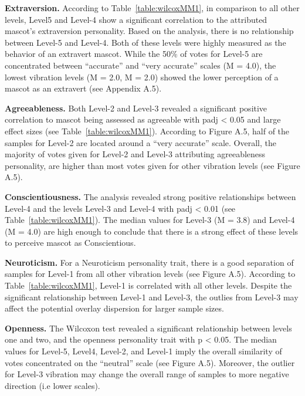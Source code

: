 \par \textbf{Extraversion.} According to Table~\ref{table:wilcoxMM1}, in comparison to all other levels, Level5 and
Level-4 show a significant correlation to the attributed mascot’s extraversion personality. Based on the analysis,
there is no relationship between Level-5 and Level-4. Both of these levels were highly measured as the behavior of an
extravert mascot. While the 50\% of votes for Level-5 are concentrated between “accurate” and “very accurate”
scales (M = 4.0), the lowest vibration levels (M = 2.0, M = 2.0) showed the lower perception of a mascot as an extravert
(see Appendix A.5).
\par \textbf{Agreeableness.} Both Level-2 and Level-3 revealed a significant positive correlation to mascot being
assessed as agreeable with padj < 0.05 and large effect sizes (see Table~\ref{table:wilcoxMM1}). According to
Figure A.5, half of the samples for Level-2 are located around a “very accurate” scale. Overall, the majority of votes
given for Level-2 and Level-3 attributing agreeableness personality, are higher than most votes given for other
vibration levels (see Figure A.5).
\par \textbf{Conscientiousness.} The analysis revealed strong positive relationships between Level-4 and the levels
Level-3 and Level-4 with padj < 0.01 (see Table~\ref{table:wilcoxMM1}). The median values for Level-3 (M = 3.8) and
Level-4 (M = 4.0) are high enough to conclude that there is a strong effect of these levels to perceive mascot as Conscientious.
\par \textbf{Neuroticism.} For a Neuroticism personality trait, there is a good separation of samples for Level-1
from all other vibration levels (see Figure A.5). According to Table~\ref{table:wilcoxMM1}, Level-1 is correlated
with all other levels. Despite the significant relationship between Level-1 and Level-3, the outlies from Level-3 may
affect the potential overlay dispersion for larger sample sizes.
\par \textbf{Openness.} The Wilcoxon test revealed a significant relationship between levels one and two, and the
openness personality trait with p < 0.05. The median values for Level-5, Level4, Level-2, and Level-1 imply the overall
similarity of votes concentrated on the “neutral” scale (see Figure A.5). Moreover, the outlier for Level-3 vibration
may change the overall range of samples to more negative direction (i.e lower scales).

